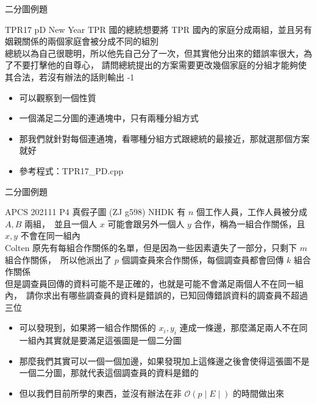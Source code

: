 \documentclass[aspectratio=169]{beamer}
\begin{document}
    \begin{frame}{二分圖例題}
        \begin{block}{TPR17 pD New Year}
            TPR 國的總統想要將 TPR 國內的家庭分成兩組，並且另有姻親關係的兩個家庭會被分成不同的組別\\
            總統以為自己很聰明，所以他先自己分了一次，但其實他分出來的錯誤率很大，為了不要打擊他的自尊心，
            請問總統提出的方案需要更改幾個家庭的分組才能夠使其合法，若沒有辦法的話則輸出 -1
        \end{block}

        \begin{itemize}
            \item<2-> 可以觀察到一個性質
            \item<2-> 一個滿足二分圖的連通塊中，只有兩種分組方式
            \item<3-> 那我們就針對每個連通塊，看哪種分組方式跟總統的最接近，那就選那個方案就好
            \item<3-> 參考程式：TPR17\_PD.cpp
        \end{itemize}
    \end{frame}

    \begin{frame}{二分圖例題}
        \begin{block}{APCS 202111 P4 真假子圖 (ZJ g598)}
            NHDK 有 $n$ 個工作人員，工作人員被分成 $A, B$ 兩組，\
            並且一個人 $x$ 可能會跟另外一個人 $y$ 合作，稱為一組合作關係，且 $x, y$ 不會在同一組內\\
            Colten 原先有每組合作關係的名單，但是因為一些因素遺失了一部分，只剩下 $m$ 組合作關係，\
            所以他派出了 $p$ 個調查員來合作關係，每個調查員都會回傳 $k$ 組合作關係\\
            但是調查員回傳的資料可能不是正確的，也就是可能不會滿足兩個人不在同一組內，\
            請你求出有哪些調查員的資料是錯誤的，已知回傳錯誤資料的調查員不超過三位
        \end{block}

        \begin{itemize}
            \item<2-> 可以發現到，如果將一組合作關係的 $x_i, y_i$ 連成一條邊，那麼滿足兩人不在同一組內其實就是要滿足這張圖是一個二分圖
            \item<3-> 那麼我們其實可以一個一個加邊，如果發現加上這條邊之後會使得這張圖不是一個二分圖，那就代表這個調查員的資料是錯的
            \item<4-> 但以我們目前所學的東西，並沒有辦法在非 $\mathcal{O}(p \mid E\mid)$ 的時間做出來
        \end{itemize}
    \end{frame}
\end{document}
